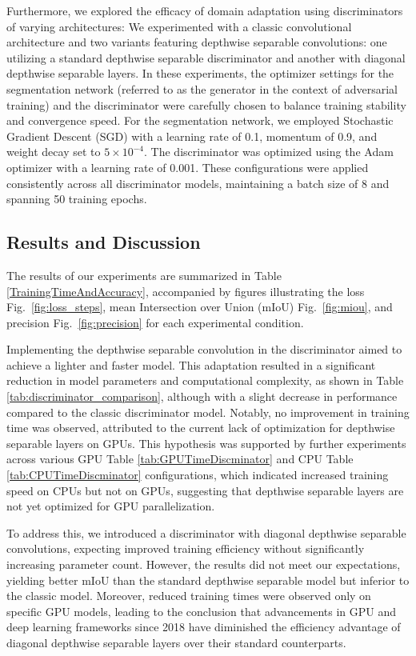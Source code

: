 \documentclass[conference]{IEEEtran}
\begin{document}
Furthermore, we explored the efficacy of domain adaptation using discriminators of varying architectures:
We experimented with a classic convolutional architecture and two variants featuring depthwise separable convolutions: one utilizing a standard depthwise separable discriminator and another with diagonal depthwise separable layers. In these experiments, the optimizer settings for the segmentation network (referred to as the generator in the context of adversarial training) and the discriminator were carefully chosen to balance training stability and convergence speed. For the segmentation network, we employed Stochastic Gradient Descent (SGD) with a learning rate of 0.1, momentum of 0.9, and weight decay set to $5 \times 10^{-4}$. The discriminator was optimized using the Adam optimizer with a learning rate of 0.001. These configurations were applied consistently across all discriminator models, maintaining a batch size of 8 and spanning 50 training epochs.


\subsection{Results and Discussion}

The results of our experiments are summarized in Table \ref{TrainingTimeAndAccuracy}, accompanied by figures illustrating the loss Fig.~\ref{fig:loss_steps}, mean Intersection over Union (mIoU) Fig.~\ref{fig:miou}, and precision Fig.~\ref{fig:precision} for each experimental condition.

Implementing the depthwise separable convolution in the discriminator aimed to achieve a lighter and faster model. This adaptation resulted in a significant reduction in model parameters and computational complexity, as shown in Table \ref{tab:discriminator_comparison}, although with a slight decrease in performance compared to the classic discriminator model. Notably, no improvement in training time was observed, attributed to the current lack of optimization for depthwise separable layers on GPUs. This hypothesis was supported by further experiments across various GPU Table \ref{tab:GPUTimeDiscminator} and CPU Table \ref{tab:CPUTimeDiscminator} configurations, which indicated increased training speed on CPUs but not on GPUs, suggesting that depthwise separable layers are not yet optimized for GPU parallelization.

To address this, we introduced a discriminator with diagonal depthwise separable convolutions, expecting improved training efficiency without significantly increasing parameter count. However, the results did not meet our expectations, yielding better mIoU than the standard depthwise separable model but inferior to the classic model. Moreover, reduced training times were observed only on specific GPU models, leading to the conclusion that advancements in GPU and deep learning frameworks since 2018 have diminished the efficiency advantage of diagonal depthwise separable layers over their standard counterparts.
\end{document}
